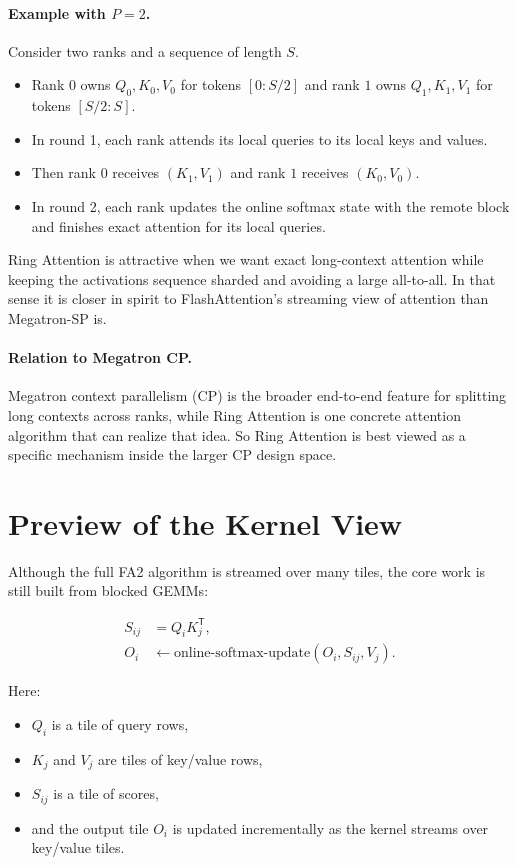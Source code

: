 \documentclass[11pt]{article}
\newcommand{\trans}{\mathsf{T}}
\begin{document}
\paragraph{Example with $P=2$.}
Consider two ranks and a sequence of length $S$.
\begin{itemize}
    \item Rank $0$ owns $Q_0, K_0, V_0$ for tokens $[0 : S/2]$ and rank $1$
    owns $Q_1, K_1, V_1$ for tokens $[S/2 : S]$.
    \item In round 1, each rank attends its local queries to its local keys and
    values.
    \item Then rank $0$ receives $(K_1, V_1)$ and rank $1$ receives $(K_0, V_0)$.
    \item In round 2, each rank updates the online softmax state with the remote
    block and finishes exact attention for its local queries.
\end{itemize}

Ring Attention is attractive when we want exact long-context attention while
keeping the activations sequence sharded and avoiding a large all-to-all. In
that sense it is closer in spirit to FlashAttention's streaming view of
attention than Megatron-SP is.

\paragraph{Relation to Megatron CP.}
Megatron context parallelism (CP) is the broader end-to-end feature for
splitting long contexts across ranks, while Ring Attention is one concrete
attention algorithm that can realize that idea. So Ring Attention is best
viewed as a specific mechanism inside the larger CP design space.

\section{Preview of the Kernel View}

Although the full FA2 algorithm is streamed over many tiles, the core work is
still built from blocked GEMMs:

\begin{align}
S_{ij} &= Q_i K_j^\trans, \\
O_i &\leftarrow \text{online-softmax-update}(O_i, S_{ij}, V_j).
\end{align}

Here:

\begin{itemize}
    \item $Q_i$ is a tile of query rows,
    \item $K_j$ and $V_j$ are tiles of key/value rows,
    \item $S_{ij}$ is a tile of scores,
    \item and the output tile $O_i$ is updated incrementally as the kernel
    streams over key/value tiles.
\end{itemize}
\end{document}
